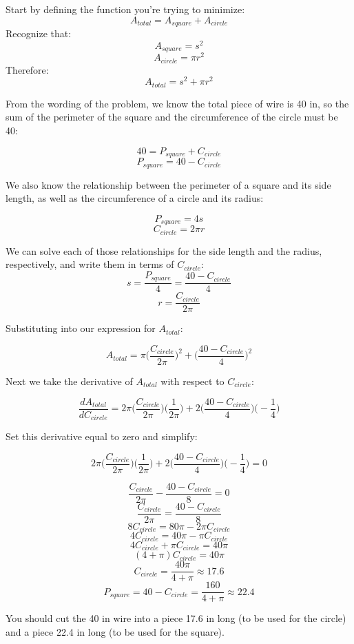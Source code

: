 \documentclass[11pt]{article}
\theoremstyle{definition}
\theoremstyle{remark}
\begin{document}
{\color{red} 
Start by defining the function you're trying to minimize:
$$A_{total} = A_{square} + A_{circle}$$
Recognize that:
$$A_{square} = s^2$$
$$A_{circle} = \pi r^2$$
Therefore:
$$A_{total} = s^2 + \pi r^2$$

From the wording of the problem, we know the total piece of wire is 40 in, so the sum of the perimeter of the square and the circumference of the circle must be 40:

$$ 40 = P_{square} + C_{circle}$$
$$ P_{square} = 40 - C_{circle}$$

We also know the relationship between the perimeter of a square and its side length, as well as the circumference of a circle and its radius:

$$P_{square} = 4s$$
$$C_{circle} = 2\pi r$$

We can solve each of those relationships for the side length and the radius, respectively, and write them in terms of $C_{circle}$:
$$ s = \frac{P_{square}}{4} = \frac{40-C_{circle}}{4}$$
$$ r = \frac{C_{circle}}{2\pi}$$

Substituting into our expression for $A_{total}$:

$$A_{total}= \pi\bigg(\frac{C_{circle}}{2\pi}\bigg)^2 + \bigg(\frac{40-C_{circle}}{4}\bigg)^2$$

Next we take the derivative of $A_{total}$ with respect to $C_{circle}$:

$$\frac{dA_{total}}{dC_{circle}} = 2\pi \bigg(\frac{C_{circle}}{2\pi}\bigg)\bigg(\frac{1}{2\pi}\bigg) 
    + 2\bigg( \frac{40-C_{circle}}{4}\bigg)\bigg(-\frac{1}{4}\bigg)$$

Set this derivative equal to zero and simplify:


$$2\pi \bigg(\frac{C_{circle}}{2\pi}\bigg)\bigg(\frac{1}{2\pi}\bigg) 
    + 2\bigg( \frac{40-C_{circle}}{4}\bigg)\bigg(-\frac{1}{4}\bigg) = 0 $$

$$\frac{C_{circle}}{2\pi} - \frac{40-C_{circle}}{8} = 0 $$
$$\frac{C_{circle}}{2\pi} = \frac{40-C_{circle}}{8}$$
$$8C_{circle} = 80\pi - 2\pi C_{circle}$$
$$4C_{circle} = 40\pi - \pi C_{circle}$$
$$4C_{circle}+ \pi C_{circle}= 40\pi $$
$$(4+ \pi) C_{circle}= 40\pi $$
$$C_{circle}= \frac{40\pi}{4+\pi} \approx 17.6$$
$$P_{square} = 40 - C_{circle} = \frac{160}{4+\pi} \approx 22.4$$

You should cut the 40 in wire into a piece 17.6 in long (to be used for the circle) and a piece 22.4 in long (to be used for the square).

}

\newpage
\end{document}
